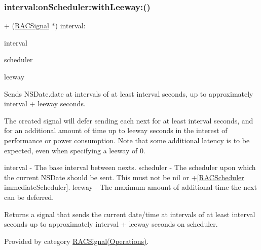 \subsubsection{\texorpdfstring{interval\+:on\+Scheduler\+:with\+Leeway\+:()}{interval:onScheduler:withLeeway:()}\hspace{0.1cm}{\footnotesize\ttfamily [2/3]}}
{\footnotesize\ttfamily + (\mbox{\hyperlink{interface_r_a_c_signal}{R\+A\+C\+Signal}} $\ast$) interval\+: \begin{DoxyParamCaption}\item[{(N\+S\+Time\+Interval)}]{interval }\item[{onScheduler:(\mbox{\hyperlink{interface_r_a_c_scheduler}{R\+A\+C\+Scheduler}} $\ast$)}]{scheduler }\item[{withLeeway:(N\+S\+Time\+Interval)}]{leeway }\end{DoxyParamCaption}}

Sends N\+S\+Date.\+date at intervals of at least {\ttfamily interval} seconds, up to approximately {\ttfamily interval} + {\ttfamily leeway} seconds.

The created signal will defer sending each {\ttfamily next} for at least {\ttfamily interval} seconds, and for an additional amount of time up to {\ttfamily leeway} seconds in the interest of performance or power consumption. Note that some additional latency is to be expected, even when specifying a {\ttfamily leeway} of 0.

interval -\/ The base interval between {\ttfamily next}s. scheduler -\/ The scheduler upon which the current N\+S\+Date should be sent. This must not be nil or +\mbox{[}\mbox{\hyperlink{interface_r_a_c_scheduler}{R\+A\+C\+Scheduler}} immediate\+Scheduler\mbox{]}. leeway -\/ The maximum amount of additional time the {\ttfamily next} can be deferred.

Returns a signal that sends the current date/time at intervals of at least {\ttfamily interval seconds} up to approximately {\ttfamily interval} + {\ttfamily leeway} seconds on {\ttfamily scheduler}. 

Provided by category \mbox{\hyperlink{category_r_a_c_signal_07_operations_08_acd968c129ec1afe3b5bc77db5fc13291}{R\+A\+C\+Signal(\+Operations)}}.

\mbox{\label{interface_r_a_c_signal_acd968c129ec1afe3b5bc77db5fc13291}} 
